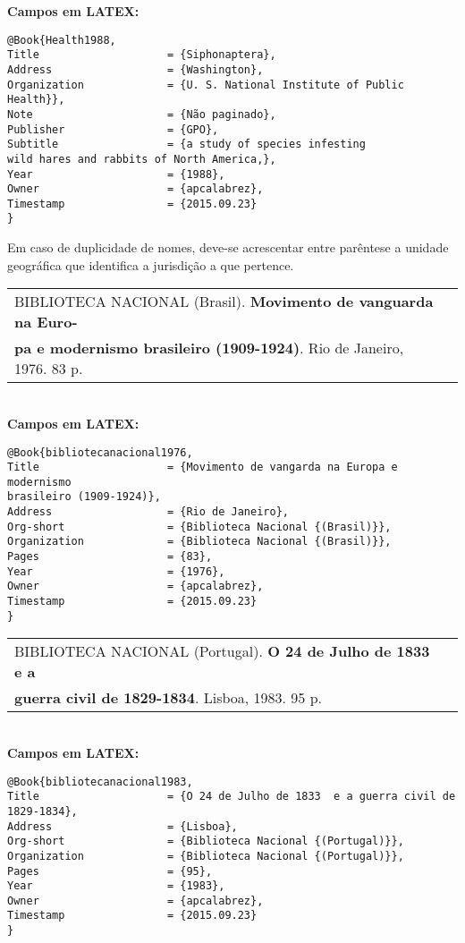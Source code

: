 \textbf{Campos em LATEX:}

\begin{verbatim}
@Book{Health1988,
Title                    = {Siphonaptera},
Address                  = {Washington},
Organization             = {U. S. National Institute of Public Health}},
Note                     = {Não paginado},
Publisher                = {GPO},
Subtitle                 = {a study of species infesting 
wild hares and rabbits of North America,},
Year                     = {1988},
Owner                    = {apcalabrez},
Timestamp                = {2015.09.23}
}
\end{verbatim}

Em caso de duplicidade de nomes, deve-se acrescentar entre par\^entese a unidade geogr\'afica que identifica a jurisdição a que pertence. \\


\begin{tabular}{|l|c|} \hline
	BIBLIOTECA NACIONAL (Brasil). \textbf{Movimento de vanguarda na Euro-} \\ \textbf{pa e modernismo brasileiro (1909-1924)}. Rio de Janeiro, 1976.	83 p.   \\\hline
\end{tabular}\\

\textbf{Campos em LATEX:}

\begin{verbatim}
@Book{bibliotecanacional1976,
Title                    = {Movimento de vangarda na Europa e modernismo
brasileiro (1909-1924)},
Address                  = {Rio de Janeiro},
Org-short                = {Biblioteca Nacional {(Brasil)}},
Organization             = {Biblioteca Nacional {(Brasil)}},
Pages                    = {83},
Year                     = {1976},
Owner                    = {apcalabrez},
Timestamp                = {2015.09.23}
}
\end{verbatim}

\begin{tabular}{|l|c|} \hline
	BIBLIOTECA NACIONAL (Portugal). \textbf{O 24 de Julho de 1833 e a} \\ \textbf{guerra civil de 1829-1834}. Lisboa, 1983. 95 p.   \\\hline
\end{tabular}\\

\textbf{Campos em LATEX:}

\begin{verbatim}
@Book{bibliotecanacional1983,
Title                    = {O 24 de Julho de 1833  e a guerra civil de 
1829-1834},
Address                  = {Lisboa},
Org-short                = {Biblioteca Nacional {(Portugal)}},
Organization             = {Biblioteca Nacional {(Portugal)}},
Pages                    = {95},
Year                     = {1983},
Owner                    = {apcalabrez},
Timestamp                = {2015.09.23}
}
\end{verbatim}


